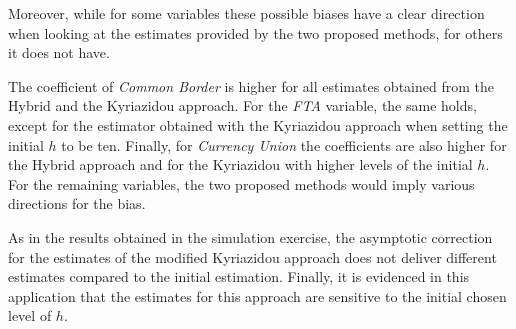 Moreover, while for some variables these possible biases have a clear direction when looking at the estimates provided by the two proposed methods, for others it does not have. 

The coefficient of \textit{Common Border} is higher for all estimates obtained from the Hybrid and the Kyriazidou approach. For the \textit{FTA} variable, the same holds, except for the estimator obtained with the Kyriazidou approach when setting the initial $h$ to be ten. Finally, for \textit{Currency Union} the coefficients are also higher for the Hybrid approach and for the Kyriazidou with higher levels of the initial $h$. For the remaining variables, the two proposed methods would imply various directions for the bias.

As in the results obtained in the simulation exercise, the asymptotic correction for the estimates of the modified Kyriazidou approach does not deliver different estimates compared to the initial estimation. Finally, it is evidenced in this application that the estimates for this approach are sensitive to the initial chosen level of $h$.


